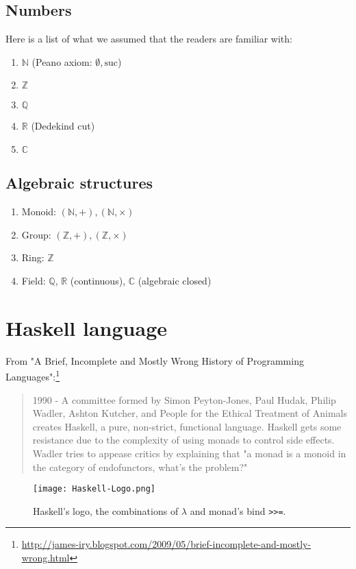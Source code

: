 \documentclass[11pt]{book}
\begin{document}
\subsection{Numbers}
Here is a list of what we assumed that the readers are familiar with:
\begin{enumerate}
\item $\mathbb{N}$ (Peano axiom: $\emptyset, \text{suc}$)
\item $\mathbb{Z}$
\item $\mathbb{Q}$
\item $\mathbb{R}$ (Dedekind cut)
\item $\mathbb{C}$ 
\end{enumerate}

\subsection{Algebraic structures}
\begin{enumerate}
\item Monoid: $(\mathbb{N},+), (\mathbb{N},\times)$
\item Group: $(\mathbb{Z},+), (\mathbb{Z},\times)$
\item Ring: $\mathbb{Z}$
\item Field: $\mathbb{Q}$, $\mathbb{R}$ (continuous), $\mathbb{C}$ (algebraic closed)
\end{enumerate}

\section{Haskell language}
From "A Brief, Incomplete and Mostly Wrong History of Programming Languages":\footnote{
\url{http://james-iry.blogspot.com/2009/05/brief-incomplete-and-mostly-wrong.html}
}
\begin{quotation}
1990 - A committee formed by Simon Peyton-Jones, Paul Hudak, Philip Wadler, Ashton Kutcher, and People for the Ethical Treatment of Animals creates Haskell, a pure, non-strict, functional language. Haskell gets some resistance due to the complexity of using monads to control side effects. Wadler tries to appease critics by explaining that "a monad is a monoid in the category of endofunctors, what's the problem?" 
\end{quotation}

\begin{figure}[htbp]
\begin{center}
\texttt{[image: Haskell-Logo.png]}
\caption{Haskell's logo, the combinations of $\lambda$ and monad's bind \texttt{>>=}.}
\label{Haskell-Logo}
\end{center}
\end{figure}
\end{document}
